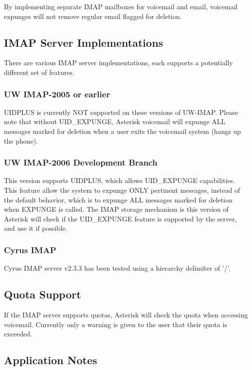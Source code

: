 By implementing separate IMAP mailboxes for voicemail and email, voicemail
expunges will not remove regular email flagged for deletion.


\subsection{IMAP Server Implementations}

There are various IMAP server implementations, each supports a potentially
different set of features.


\subsubsection{UW IMAP-2005 or earlier}

UIDPLUS is currently NOT supported on these versions of UW-IMAP.  Please note
that without UID\_EXPUNGE, Asterisk voicemail will expunge ALL messages marked
for deletion when a user exits the voicemail system (hangs up the phone).

\subsubsection{UW IMAP-2006 Development Branch}

This version supports UIDPLUS, which allows UID\_EXPUNGE capabilities.  This
feature allow the system to expunge ONLY pertinent messages, instead of the
default behavior, which is to expunge ALL messages marked for deletion when
EXPUNGE is called.  The IMAP storage mechanism is this version of Asterisk
will check if the UID\_EXPUNGE feature is supported by the server, and use it
if possible.

\subsubsection{Cyrus IMAP}

Cyrus IMAP server v2.3.3 has been tested using a hierarchy delimiter of '/'.


\subsection{Quota Support}

If the IMAP server supports quotas, Asterisk will check the quota when
accessing voicemail.  Currently only a warning is given to the user that
their quota is exceeded.


\subsection{Application Notes}

